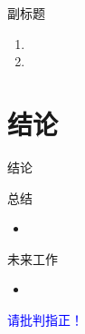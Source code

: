 \documentclass{beamer}
\begin{document}
	
	\begin{frame}{副标题}
        \begin{enumerate}
            \item 
            \item
        \end{enumerate}
	\end{frame}

	
	\section{结论}
	
	
	\begin{frame}{结论}
		
		\begin{block}{总结}
			\begin{itemize}
				\item 
			\end{itemize}
		\end{block}

	\hspace*{\fill}
	\begin{block}{未来工作}
		\begin{itemize}
			\item 
		\end{itemize}
	\end{block}
		
	\end{frame}
	
	
	\begin{frame}
		
		\thispagestyle{empty}
		
		\begin{center}
			
			\textcolor{blue}{\Huge{请批判指正！}}
			
		\end{center}
		
	\end{frame}
	
	
\end{document}
